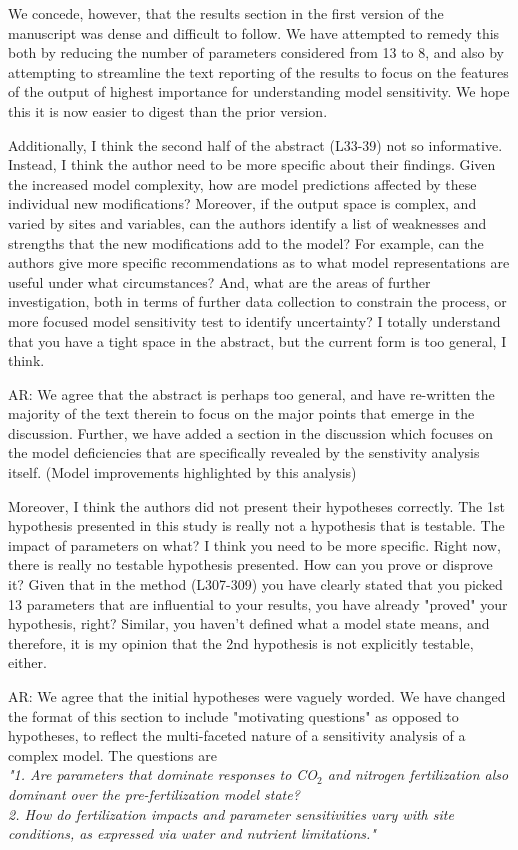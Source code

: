\documentclass{article}
\begin{document}
\textsf{We concede, however, that the results section in the first version of the manuscript was dense and difficult to follow. We have attempted to remedy this both by reducing the number of parameters considered from 13 to 8, and also by attempting to streamline the text reporting of the results to focus on the features of the output of highest importance for understanding model sensitivity. We hope this it is now easier to digest than the prior version.} 

Additionally, I think the second half of the abstract (L33-39) not so informative. Instead, I think the author need to be more specific about their findings. Given the increased model complexity, how are model predictions affected by these individual new modifications? Moreover, if the output space is complex, and varied by sites and variables, can the authors identify a list of weaknesses and strengths that the new modifications add to the model? For example, can the authors give more specific recommendations as to what model representations are useful under what circumstances? And, what are the areas of further investigation, both in terms of further data collection to constrain the process, or more focused model sensitivity test to identify uncertainty? I totally understand that you have a tight space in the abstract, but the current form is too general, I think. 

\textsf{AR: We agree that the abstract is perhaps too general, and have re-written the majority of the text therein to focus on the major points that emerge in the discussion.  Further, we have added a section in the discussion which focuses on the model deficiencies that are specifically revealed by the senstivity analysis itself. (Model improvements highlighted by this analysis)}

Moreover, I think the authors did not present their hypotheses correctly. The 1st hypothesis presented in this study is really not a hypothesis that is testable. The impact of parameters on what? I think you need to be more specific. Right now, there is really no testable hypothesis presented. How can you prove or disprove it? Given that in the method (L307-309) you have clearly stated that you picked 13 parameters that are influential to your results, you have already "proved" your hypothesis, right? Similar, you haven't defined what a model state means, and therefore, it is my opinion that the 2nd hypothesis is not explicitly testable, either. 

\textsf{AR: We agree that the initial hypotheses were vaguely worded. We have changed the format of this section to include "motivating questions" as opposed to hypotheses, to reflect the multi-faceted nature of a sensitivity analysis of a complex model. The questions are\\ \emph{"1. Are parameters that dominate responses to CO$_{2}$ and nitrogen fertilization also dominant over the pre-fertilization model state?\\
2. How do fertilization impacts and parameter sensitivities vary with site conditions, as expressed via water and nutrient limitations." }}
\end{document}
